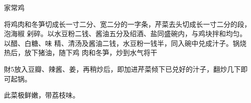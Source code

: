 \begin{recipe}{家常鸡}

\ingredients


\preparation

将鸡肉和冬笋切成长一寸二分、宽二分的一字条，芹菜去头切成长一寸二分的段，泡海椒
剁碎。以水豆粉二钱、酱油五分及绍酒、盐同盛碗内，与鸡块拌和均匀。以醋、白糖、味
精、清汤及酱油二钱，水豆粉一钱半，同入碗中兑成汁子。锅烧热后，放下猪油，随下鸡
肉和冬笋，炒到水气将干

財5放入豆瓣、辣酱、姜，再稍炒后，即加进芹菜倾下已兑好的汁子，翻炒几下即可起锅。

\features

此菜极鲜嫩，带荔枝味。

\end{recipe}

